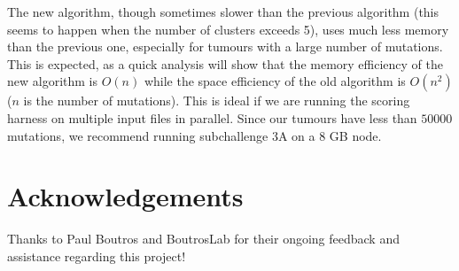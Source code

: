 \documentclass[a4paper, 11pt]{article}
\begin{document}
\begin{center}
    \begin{table}[H]
    \centering
    \caption{Timing Analysis}
    \label{table:om}
    \end{table}
\end{center}

\begin{center}
    \begin{table}[ht]
    \centering
    \caption{Timing vs Memory}
    \label{table:om}
    \end{table}
\end{center}

The new algorithm, though sometimes slower than the previous algorithm (this seems to happen when the number of clusters exceeds 5), uses much less memory than the previous one, especially for tumours with a large number of mutations. This is expected, as a quick analysis will show that the memory efficiency of the new algorithm is $O(n)$ while the space efficiency of the old algorithm is $O(n^2)$ ($n$ is the number of mutations). This is ideal if we are running the scoring harness on multiple input files in parallel. Since our tumours have less than $50000$ mutations, we recommend running subchallenge 3A on a 8 GB node.  

\section*{Acknowledgements}
Thanks to Paul Boutros and BoutrosLab for their ongoing feedback and assistance regarding this project!
\end{document}
